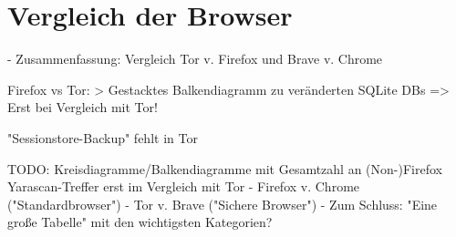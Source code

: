 \chapter{Vergleich der Browser}

- Zusammenfassung: Vergleich Tor v. Firefox und Brave v. Chrome

Firefox vs Tor:
	> Gestacktes Balkendiagramm zu veränderten SQLite DBs => Erst bei Vergleich mit Tor!
	
 "Sessionstore-Backup" fehlt in Tor

TODO: Kreisdiagramme/Balkendiagramme mit Gesamtzahl an (Non-)Firefox Yarascan-Treffer erst im Vergleich mit Tor
- Firefox v. Chrome ("Standardbrowser")
- Tor v. Brave ("Sichere Browser")
- Zum Schluss: "Eine große Tabelle" mit den wichtigsten Kategorien?